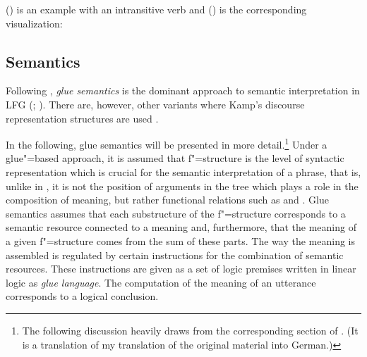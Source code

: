 () is an example with an intransitive verb and () is the corresponding visualization:

\ea
{}
\z

\ea
{}
\hspace*{4em}
\z
{}

\subsection{Semantics}
\label{lfg-semantics}
\label{glue-semantics}

Following \citet[--92]{Dalrymple2006a}, \emph{glue semantics} is the dominant approach to semantic interpretation in LFG
(\citealp*{DLS93a-u}; \citealp[Chapter~8]{Dalrymple2001a-u}). There are, however, other variants
where Kamp's discourse representation structures \citep{KR93a} are used \citep{FR83b,FR83a}.

In the following, glue semantics will be presented in more detail.\footnote{%
The following discussion heavily draws from the corresponding section of . (It
is a translation of my translation of the original material into German.)
}
Under a glue"=based approach, it is assumed that f"=structure is the level of syntactic representation which is crucial for the semantic interpretation of
a phrase, that is, unlike in \gbt, it is not the position of arguments in the tree which plays a role in the composition of meaning, but rather functional relations such as 
\lfgsubj and \lfgobj. Glue semantics assumes that each substructure of the f"=structure corresponds to a semantic resource connected to a meaning and, furthermore, that the meaning
of a given f"=structure comes from the sum of these parts. The way the meaning is assembled is
regulated by certain instructions for the combination of semantic resources. These instructions are given
as a set of logic premises written in linear logic as \emph{glue language}. The computation of the meaning of an utterance corresponds to a logical conclusion.

